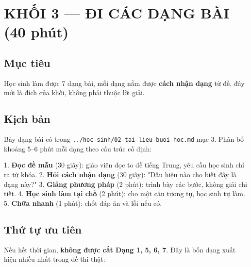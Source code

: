 \documentclass[11pt, a4paper]{article}
\begin{document}
\section{KHỐI 3 — ĐI CÁC DẠNG BÀI (40 phút)}

\subsection{Mục tiêu}

Học sinh làm được 7 dạng bài, mỗi dạng nắm được \textbf{cách nhận dạng} từ đề, đây mới là đích của khối, không phải thuộc lời giải.

\subsection{Kịch bản}

Bảy dạng bài có trong \texttt{../hoc-sinh/02-tai-lieu-buoi-hoc.md} mục 3. Phân bổ khoảng 5–6 phút mỗi dạng theo cấu trúc cố định:

1. \textbf{Đọc đề mẫu} (30 giây): giáo viên đọc to đề tiếng Trung, yêu cầu học sinh chỉ ra từ khóa.
2. \textbf{Hỏi cách nhận dạng} (30 giây): "Dấu hiệu nào cho biết đây là dạng này?"
3. \textbf{Giảng phương pháp} (2 phút): trình bày các bước, không giải chi tiết.
4. \textbf{Học sinh làm tại chỗ} (2 phút): cho một câu tương tự, học sinh tự làm.
5. \textbf{Chữa nhanh} (1 phút): chốt đáp án và lỗi nếu có.

\subsection{Thứ tự ưu tiên}

Nếu hết thời gian, \textbf{không được cắt Dạng 1, 5, 6, 7}. Đây là bốn dạng xuất hiện nhiều nhất trong đề thi thật:

\end{document}
